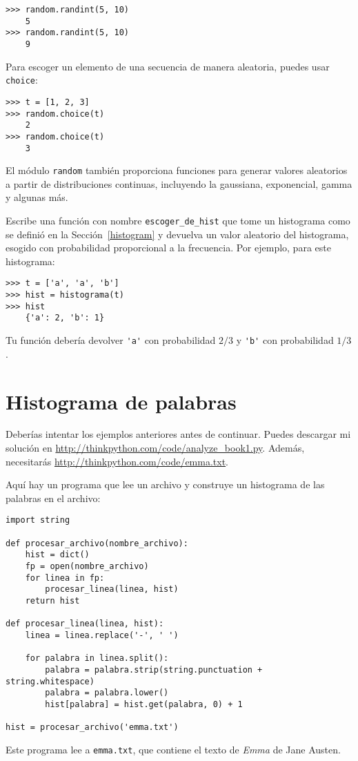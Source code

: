 \documentclass[10pt]{book}
\begin{document}
\begin{verbatim}
>>> random.randint(5, 10)
    5
>>> random.randint(5, 10)
    9
\end{verbatim}
%
Para escoger un elemento de una secuencia de manera aleatoria, puedes usar
{\tt choice}:

\begin{verbatim}
>>> t = [1, 2, 3]
>>> random.choice(t)
    2
>>> random.choice(t)
    3
\end{verbatim}
%
El módulo {\tt random} también proporciona funciones para generar
valores aleatorios a partir de distribuciones continuas, incluyendo
la gaussiana, exponencial, gamma y algunas más.

\begin{exercise}

Escribe una función con nombre \verb"escoger_de_hist" que tome
un histograma como se definió en la Sección~\ref{histogram} y devuelva un
valor aleatorio del histograma, esogido con probabilidad
proporcional a la frecuencia.  Por ejemplo, para este histograma:

\begin{verbatim}
>>> t = ['a', 'a', 'b']
>>> hist = histograma(t)
>>> hist
    {'a': 2, 'b': 1}
\end{verbatim}
%
Tu función debería devolver \verb"'a'" con probabilidad $2/3$ y \verb"'b'"
con probabilidad $1/3$.
\end{exercise}


\section{Histograma de palabras}

Deberías intentar los ejemplos anteriores antes de continuar.
Puedes descargar mi solución en
 \url{http://thinkpython.com/code/analyze_book1.py}.  Además,
necesitarás \url{http://thinkpython.com/code/emma.txt}.

Aquí hay un programa que lee un archivo y construye un histograma de las
palabras en el archivo:

\begin{verbatim}
import string

def procesar_archivo(nombre_archivo):
    hist = dict()
    fp = open(nombre_archivo)
    for linea in fp:
        procesar_linea(linea, hist)
    return hist

def procesar_linea(linea, hist):
    linea = linea.replace('-', ' ')

    for palabra in linea.split():
        palabra = palabra.strip(string.punctuation + string.whitespace)
        palabra = palabra.lower()
        hist[palabra] = hist.get(palabra, 0) + 1

hist = procesar_archivo('emma.txt')
\end{verbatim}
%
Este programa lee a {\tt emma.txt}, que contiene el texto de {\em
  Emma} de Jane Austen.
\end{document}
